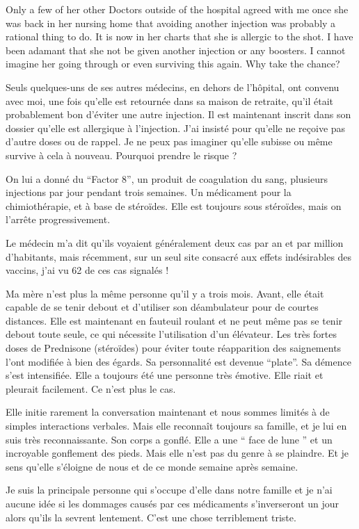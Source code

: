Only a few of her other Doctors outside of the hospital agreed with me once she
was back in her nursing home that avoiding another injection was probably a
rational thing to do. It is now in her charts that she is allergic to the
shot. I have been adamant that she not be given another injection or any
boosters. I cannot imagine her going through or even surviving this again. Why
take the chance?

Seuls quelques-uns de ses autres médecins, en dehors de l'hôpital, ont convenu
avec moi, une fois qu'elle est retournée dans sa maison de retraite, qu'il était
probablement bon d'éviter une autre injection. Il est maintenant inscrit dans
son dossier qu'elle est allergique à l'injection. J'ai insisté pour qu'elle ne
reçoive pas d'autre doses ou de rappel. Je ne peux pas imaginer qu'elle subisse
ou même survive à cela à nouveau. Pourquoi prendre le risque ?

On lui a donné du “Factor 8”, un produit de coagulation du sang, plusieurs
injections par jour pendant trois semaines. Un médicament pour la
chimiothérapie, et à base de stéroïdes. Elle est toujours sous stéroïdes, mais
on l'arrête progressivement.

Le médecin m'a dit qu'ils voyaient généralement deux cas par an et par million
d'habitants, mais récemment, sur un seul site consacré aux effets indésirables
des vaccins, j'ai vu 62 de ces cas signalés !

Ma mère n'est plus la même personne qu'il y a trois mois. Avant, elle était
capable de se tenir debout et d'utiliser son déambulateur pour de courtes
distances. Elle est maintenant en fauteuil roulant et ne peut même pas se tenir
debout toute seule, ce qui nécessite l'utilisation d'un élévateur. Les très
fortes doses de Prednisone (stéroïdes) pour éviter toute réapparition des
saignements l'ont modifiée à bien des égards. Sa personnalité est devenue
“plate”. Sa démence s'est intensifiée. Elle a toujours été une personne très
émotive. Elle riait et pleurait facilement. Ce n'est plus le cas.

Elle initie rarement la conversation maintenant et nous sommes limités à de
simples interactions verbales. Mais elle reconnaît toujours sa famille, et je
lui en suis très reconnaissante. Son corps a gonflé. Elle a une “ face de lune ”
et un incroyable gonflement des pieds. Mais elle n'est pas du genre à se
plaindre. Et je sens qu'elle s'éloigne de nous et de ce monde semaine après
semaine.

Je suis la principale personne qui s'occupe d'elle dans notre famille et je n'ai
aucune idée si les dommages causés par ces médicaments s'inverseront un jour
alors qu'ils la sevrent lentement. C'est une chose terriblement triste.

